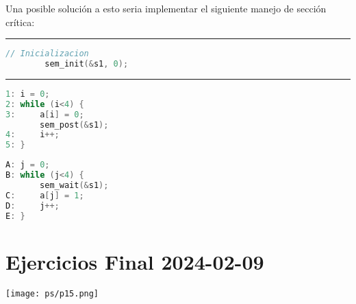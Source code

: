 \documentclass[openany]{book}
\begin{document}
\begin{rta}
    Una posible solución a esto seria implementar el siguiente manejo de sección crítica: \newline
    \hrule
    \begin{lstlisting}[language=C]
        // Inicializacion
        sem_init(&s1, 0);
    \end{lstlisting}
    \hrule
    \begin{minipage}{0.49\textwidth}
\begin{lstlisting}[language=C]
1: i = 0;
2: while (i<4) {
3:     a[i] = 0;
       sem_post(&s1);
4:     i++;
5: }
\end{lstlisting}
    \end{minipage}
    \begin{minipage}{0.49\textwidth}
\begin{lstlisting}[language=C]
A: j = 0;
B: while (j<4) {
       sem_wait(&s1);
C:     a[j] = 1;
D:     j++;
E: }
\end{lstlisting}
    \end{minipage}

\end{rta}

\section*{Ejercicios Final 2024-02-09}

\texttt{[image: ps/p15.png]}
\end{document}
